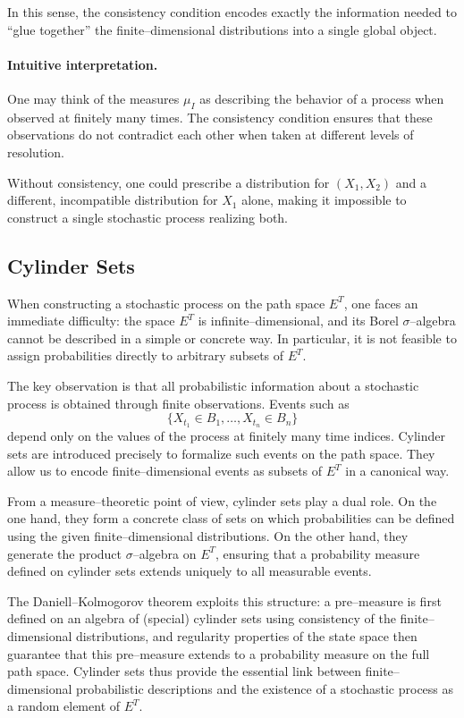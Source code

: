 In this sense, the consistency condition encodes exactly the information needed to
``glue together'' the finite--dimensional distributions into a single global object.

\paragraph{Intuitive interpretation.}
One may think of the measures $\mu_I$ as describing the behavior of a process when
observed at finitely many times. The consistency condition ensures that these observations
do not contradict each other when taken at different levels of resolution.

Without consistency, one could prescribe a distribution for $(X_1,X_2)$ and a different,
incompatible distribution for $X_1$ alone, making it impossible to construct a single
stochastic process realizing both.


\subsection{Cylinder Sets}

When constructing a stochastic process on the path space $E^T$, one faces an immediate
difficulty: the space $E^T$ is infinite--dimensional, and its Borel $\sigma$--algebra
cannot be described in a simple or concrete way. In particular, it is not feasible to
assign probabilities directly to arbitrary subsets of $E^T$.

The key observation is that all probabilistic information about a stochastic process is
obtained through finite observations. Events such as
\[
\{X_{t_1} \in B_1,\dots,X_{t_n} \in B_n\}
\]
depend only on the values of the process at finitely many time indices. Cylinder sets
are introduced precisely to formalize such events on the path space. They allow us to
encode finite--dimensional events as subsets of $E^T$ in a canonical way.

From a measure--theoretic point of view, cylinder sets play a dual role. On the one hand,
they form a concrete class of sets on which probabilities can be defined using the given
finite--dimensional distributions. On the other hand, they generate the product
$\sigma$--algebra on $E^T$, ensuring that a probability measure defined on cylinder sets
extends uniquely to all measurable events.

The Daniell--Kolmogorov theorem exploits this structure: a pre--measure is first defined
on an algebra of (special) cylinder sets using consistency of the finite--dimensional
distributions, and regularity properties of the state space then guarantee that this
pre--measure extends to a probability measure on the full path space. Cylinder sets thus
provide the essential link between finite--dimensional probabilistic descriptions and
the existence of a stochastic process as a random element of $E^T$.

